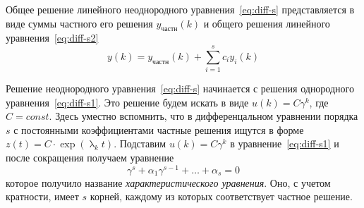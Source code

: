 \documentclass[../../calc-math-exam-2023.tex]{subfiles}
\begin{document}
    \begin{theorem}
        Общее решение линейного неоднородного уравнения~\eqref{eq:diff-s} представляется в виде суммы частного его решения
        $\displaystyle y_{\textit{частн}}(k)$ и общего решения линейного уравнения~\eqref{eq:diff-s2}
        \begin{equation*}
            y(k) = y_{\textit{частн}}(k) + \sum_{i=1}^{s} c_i y_i (k)
        \end{equation*}
    \end{theorem}
    Решение неоднородного уравнения~\eqref{eq:diff-s} начинается с решения однородного
    уравнения~\eqref{eq:diff-s1}. Это решение будем искать в виде $\displaystyle u(k) = C\gamma^k$, где
    $\displaystyle C = const$. Здесь уместно вспомнить, что в дифференцальном уравнении порядка $s$ с постоянными
    коэффициентами частные решения ищутся в форме $\displaystyle z(t) = C \cdot \exp(\uplambda_k t)$. Подставим
    $\displaystyle u(k) = C\gamma^k$ в уравнение~\eqref{eq:diff-s1} и после сокращения получаем уравнение
    \begin{equation}
        \gamma^s + \alpha_1 \gamma^{s-1} + \dots + \alpha_s = 0
    \end{equation}
    которое получило название \emph{характеристического уравнения}. Оно, с учетом кратности,
    имеет $s$ корней, каждому из которых соответствует частное решение.
\end{document}
